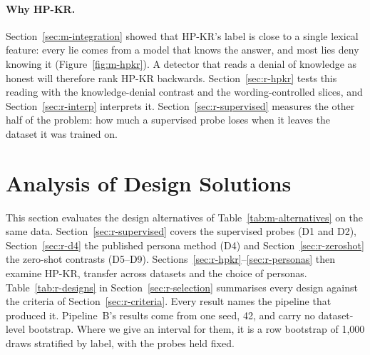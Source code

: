 \paragraph{Why HP-KR.} Section~\ref{sec:m-integration} showed that HP-KR's label is close to a single lexical feature: every lie comes from a model that knows the answer, and most lies deny knowing it (Figure~\ref{fig:m-hpkr}). %
A detector that reads a denial of knowledge as honest will therefore rank HP-KR backwards. %
Section~\ref{sec:r-hpkr} tests this reading with the knowledge-denial contrast and the wording-controlled slices, and Section~\ref{sec:r-interp} interprets it.
Section~\ref{sec:r-supervised} measures the other half of the problem: how much a supervised probe loses when it leaves the dataset it was trained on.


\section{Analysis of Design Solutions}
\label{sec:r-analysis}

This section evaluates the design alternatives of Table~\ref{tab:m-alternatives} on the same data.
Section~\ref{sec:r-supervised} covers the supervised probes (D1 and D2), Section~\ref{sec:r-d4} the published persona method (D4) and Section~\ref{sec:r-zeroshot} the zero-shot contrasts (D5--D9).
Sections~\ref{sec:r-hpkr}--\ref{sec:r-personas} then examine HP-KR, transfer across datasets and the choice of personas.
Table~\ref{tab:r-designs} in Section~\ref{sec:r-selection} summarises every design against the criteria of Section~\ref{sec:r-criteria}.
Every result names the pipeline that produced it.
Pipeline~B's results come from one seed, 42, and carry no dataset-level bootstrap. %
Where we give an interval for them, it is a row bootstrap of 1{,}000 draws stratified by label, with the probes held fixed. %

